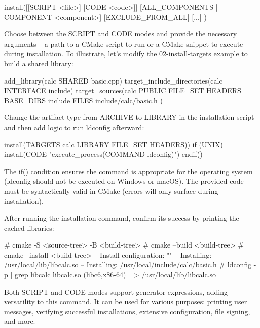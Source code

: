 \begin{shell}
install([[SCRIPT <file>] [CODE <code>]]
        [ALL_COMPONENTS | COMPONENT <component>]
        [EXCLUDE_FROM_ALL] [...]
)
\end{shell}

Choose between the SCRIPT and CODE modes and provide the necessary arguments – a path to a CMake script to run or a CMake snippet to execute during installation. To illustrate, let’s modify the 02-install-targets example to build a shared library:


\begin{cmake}
add_library(calc SHARED basic.cpp)
target_include_directories(calc INTERFACE include)
target_sources(calc PUBLIC FILE_SET HEADERS
                           BASE_DIRS include
                           FILES include/calc/basic.h
)
\end{cmake}

Change the artifact type from ARCHIVE to LIBRARY in the installation script and then add logic to run ldconfig afterward:


\begin{cmake}
install(TARGETS calc LIBRARY FILE_SET HEADERS))
if (UNIX)
    install(CODE "execute_process(COMMAND ldconfig)")
endif()
\end{cmake}

The if() condition ensures the command is appropriate for the operating system (ldconfig should not be executed on Windows or macOS). The provided code must be syntactically valid in CMake (errors will only surface during installation).

After running the installation command, confirm its success by printing the cached libraries:

\begin{shell}
# cmake -S <source-tree> -B <build-tree>
# cmake --build <build-tree>
# cmake --install <build-tree>
-- Install configuration: ""
-- Installing: /usr/local/lib/libcalc.so
-- Installing: /usr/local/include/calc/basic.h
# ldconfig -p | grep libcalc
        libcalc.so (libc6,x86-64) => /usr/local/lib/libcalc.so
\end{shell}

Both SCRIPT and CODE modes support generator expressions, adding versatility to this command. It can be used for various purposes: printing user messages, verifying successful installations, extensive configuration, file signing, and more.

